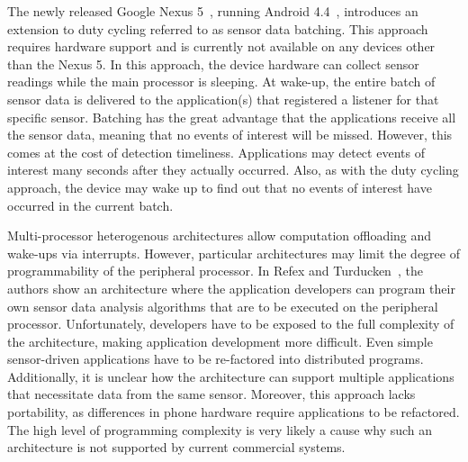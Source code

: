 The newly released Google Nexus 5~\cite{nexus5}, running Android
4.4~\cite{android4.4}, introduces an extension to duty cycling
referred to as sensor data batching. This approach requires hardware
support and is currently not available on any devices other than the
Nexus 5. In this approach, the device hardware can collect sensor
readings while the main processor is sleeping. At wake-up, the entire
batch of sensor data is delivered to the application(s) that
registered a listener for that specific sensor. Batching has the great
advantage that the applications receive all the sensor data, meaning
that no events of interest will be missed. However, this comes at the
cost of detection timeliness.  Applications may detect events of
interest many seconds after they actually occurred. Also, as with the
duty cycling approach, the device may wake up to find out that no
events of interest have occurred in the current batch.

Multi-processor heterogenous architectures allow computation
offloading and wake-ups via interrupts. However, particular
architectures may limit the degree of programmability of the
peripheral processor.  In Refex\cite{reflex} and
Turducken~\cite{turducken}, the authors show an architecture where the
application developers can program their own sensor data analysis
algorithms that are to be executed on the peripheral processor.
Unfortunately, developers have to be exposed to the full complexity of
the architecture, making application development more difficult. Even
simple sensor-driven applications have to be re-factored into
distributed programs. Additionally, it is unclear how the architecture
can support multiple applications that necessitate data from the same
sensor.  Moreover, this approach lacks portability, as differences in
phone hardware require applications to be refactored. The high level of
programming complexity is very likely a cause why such an architecture
is not supported by current commercial systems.


